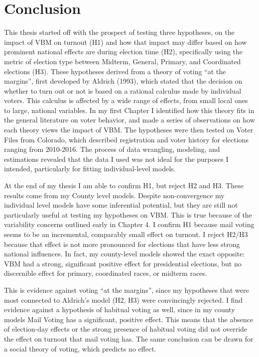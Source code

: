 \documentclass[12pt,twoside]{reedthesis}
\begin{document}
  \chapter*{Conclusion}\label{conclusion}
  
  \setcounter{chapter}{5} \setcounter{section}{0}
  
  This thesis started off with the prospect of testing three hypotheses,
  on the impact of VBM on turnout (H1) and how that impact may differ
  based on how prominent national effects are during election time (H2),
  specifically using the metric of election type between Midterm, General,
  Primary, and Coordinated elections (H3). These hypotheses derived from a
  theory of voting ``at the margins'', first developed by Aldrich (1993),
  which stated that the decision on whether to turn out or not is based on
  a rational calculus made by individual voters. This calculus is affected
  by a wide range of effects, from small local ones to large, national
  variables. In my first Chapter I identified how this theory fits in the
  general literature on voter behavior, and made a series of observations
  on how each theory views the impact of VBM. The hypotheses were then
  tested on Voter Files from Colorado, which described registration and
  voter history for elections ranging from 2010-2016. The process of data
  wrangling, modeling, and estimations revealed that the data I used was
  not ideal for the purposes I intended, particularly for fitting
  individual-level models.
  
  At the end of my thesis I am able to confirm H1, but reject H2 and H3.
  These results come from my County level models. Despite non-convergence
  my individual level models have some inferential potential, but they are
  still not particularly useful at testing my hypotheses on VBM. This is
  true because of the variability concerns outlined early in Chapter 4. I
  confirm H1 because mail voting seems to be an incremental, comparably
  small effect on turnout. I reject H2/H3 because that effect is not more
  pronounced for elections that have less strong national influences. In
  fact, my county-level models showed the exact opposite: VBM had a
  strong, significant positive effect for presidential elections, but no
  discernible effect for primary, coordinated races, or midterm races.
  
  This is evidence against voting ``at the margins'', since my hypotheses
  that were most connected to Aldrich's model (H2, H3) were convincingly
  rejected. I find evidence against a hypothesis of habitual voting as
  well, since in my county models Mail Voting has a significant, positive
  effect. This means that the absence of election-day effects or the
  strong presence of habitual voting did not override the effect on
  turnout that mail voting has. The same conclusion can be drawn for a
  social theory of voting, which predicts no effect.
  
\end{document}
